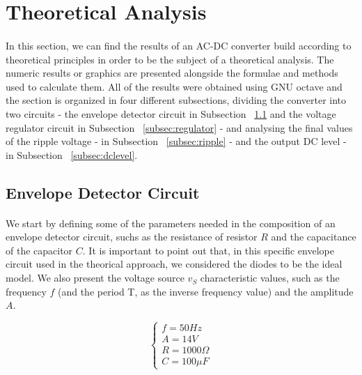 \section{Theoretical Analysis}
\label{sec:analysis}

\paragraph{}
In this section, we can find the results of an AC-DC converter build according to theoretical principles in order to be the subject of a theoretical analysis. The numeric results or graphics are presented alongside the formulae and methods used to calculate them. All of the results were obtained using GNU octave and the section is organized in four different subsections, dividing the converter into two circuits - the envelope detector circuit in Subsection ~\ref{subsec:envelope} and the voltage regulator circuit in Subsection ~\ref{subsec:regulator} - and analysing the final values of the ripple voltage - in Subsection ~\ref{subsec:ripple} - and the output DC level - in Subsection ~\ref{subsec:dclevel}.



\subsection{Envelope Detector Circuit}
\label{subsec:envelope}

\paragraph{}
We start by defining some of the parameters needed in the composition of an envelope detector circuit, suchs as the resistance of resistor $R$ and the capacitance of the capacitor $C$. It is important to point out that, in this specific envelope circuit used in the theorical approach, we considered the diodes to be the ideal model. We also present the voltage source $v_S$ characteristic values, such as the frequency $f$ (and the period T, as the inverse frequency value) and the amplitude $A$.

\[
\left\{\begin{matrix}
f = 50 Hz\\
A= 14 V\\
R= 1000 \Omega\\
C=100 \mu F
\end{matrix}\right.
\]

